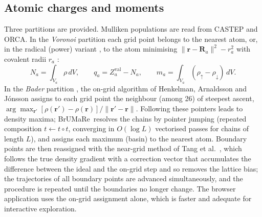\documentclass[11pt,a4paper]{article}
\newcommand{\BMR}{\textsf{BrUMa\textcolor[HTML]{B26B00}{Re}}}
\begin{document}
\subsection{Atomic charges and moments}
Three partitions are provided. Mulliken populations \cite{mulliken1955,segall1996} are read from CASTEP and ORCA. In the \emph{Voronoi} partition \cite{voronoi1908} each grid point belongs to the nearest atom, or, in the radical (power) variant \cite{gellatly1982}, to the atom minimising $\lVert\mathbf r-\mathbf R_a\rVert^2-r_a^2$ with covalent radii $r_a$ \cite{cordero2008}:
\begin{equation}
N_a=\int_{V_a}\rho\,dV,\qquad q_a=Z_a^\mathrm{val}-N_a,\qquad m_a=\int_{V_a}(\rho_\uparrow-\rho_\downarrow)\,dV .
\end{equation}
In the \emph{Bader} partition \cite{bader1990}, the on-grid algorithm of Henkelman, Arnaldsson and Jónsson \cite{henkelman2006} assigns to each grid point the neighbour (among 26) of steepest ascent, $\arg\max_{\mathbf r'}[\rho(\mathbf r')-\rho(\mathbf r)]/\lVert\mathbf r'-\mathbf r\rVert$. Following these pointers leads to density maxima; \BMR\ resolves the chains by pointer jumping (repeated composition $t\leftarrow t\circ t$, converging in $O(\log L)$ vectorised passes for chains of length $L$), and assigns each maximum (basin) to the nearest atom. Boundary points are then reassigned with the near-grid method of Tang et al.\ \cite{tang2009bader}, which follows the true density gradient with a correction vector that accumulates the difference between the ideal and the on-grid step and so removes the lattice bias; the trajectories of all boundary points are advanced simultaneously, and the procedure is repeated until the boundaries no longer change. The browser application uses the on-grid assignment alone, which is faster and adequate for interactive exploration.
\end{document}
